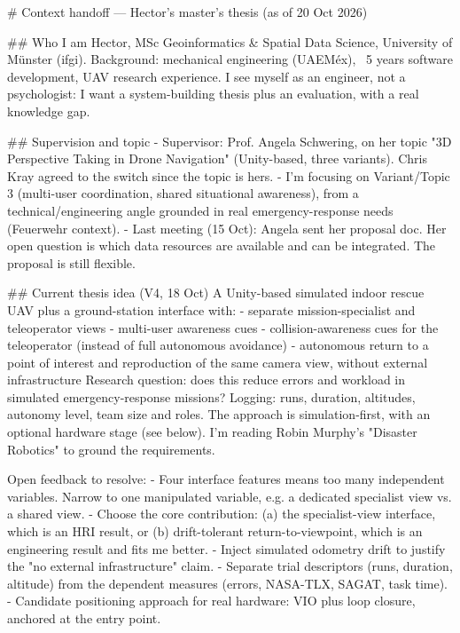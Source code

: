 # Context handoff — Hector's master's thesis (as of 20 Oct 2026)

## Who I am
Hector, MSc Geoinformatics & Spatial Data Science, University of Münster (ifgi).
Background: mechanical engineering (UAEMéx), ~5 years software development, UAV research experience.
I see myself as an engineer, not a psychologist: I want a system-building thesis plus an evaluation, with a real knowledge gap.

## Supervision and topic
- Supervisor: Prof. Angela Schwering, on her topic "3D Perspective Taking in Drone Navigation"
  (Unity-based, three variants). Chris Kray agreed to the switch since the topic is hers.
- I'm focusing on Variant/Topic 3 (multi-user coordination, shared situational awareness),
  from a technical/engineering angle grounded in real emergency-response needs (Feuerwehr context).
- Last meeting (15 Oct): Angela sent her proposal doc. Her open question is which data resources
  are available and can be integrated. The proposal is still flexible.

## Current thesis idea (V4, 18 Oct)
A Unity-based simulated indoor rescue UAV plus a ground-station interface with:
- separate mission-specialist and teleoperator views
- multi-user awareness cues
- collision-awareness cues for the teleoperator (instead of full autonomous avoidance)
- autonomous return to a point of interest and reproduction of the same camera view,
  without external infrastructure
Research question: does this reduce errors and workload in simulated emergency-response missions?
Logging: runs, duration, altitudes, autonomy level, team size and roles.
The approach is simulation-first, with an optional hardware stage (see below).
I'm reading Robin Murphy's "Disaster Robotics" to ground the requirements.

Open feedback to resolve:
- Four interface features means too many independent variables. Narrow to one manipulated
  variable, e.g. a dedicated specialist view vs. a shared view.
- Choose the core contribution:
  (a) the specialist-view interface, which is an HRI result, or
  (b) drift-tolerant return-to-viewpoint, which is an engineering result and fits me better.
- Inject simulated odometry drift to justify the "no external infrastructure" claim.
- Separate trial descriptors (runs, duration, altitude) from the dependent measures
  (errors, NASA-TLX, SAGAT, task time).
- Candidate positioning approach for real hardware: VIO plus loop closure, anchored at the entry point.

